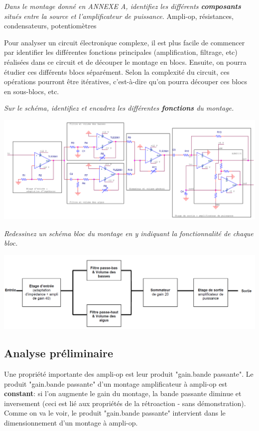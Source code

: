 {
\textit{Dans le montage donné en ANNEXE A, identifiez les différents \textbf{composants} situés entre la source et l'amplificateur de puissance.}
}
{%
Ampli-op, résistances, condensateurs, potentiomètres
}

Pour analyser un circuit électronique complexe, il est plus facile de commencer par identifier les différentes fonctions principales (amplification, filtrage, etc) réalisées dans ce circuit et de découper le montage en blocs. Ensuite, on pourra étudier ces différents blocs séparément. Selon la complexité du circuit, ces opérations pourront être itératives, c'est-à-dire qu'on pourra découper ces blocs en sous-blocs, etc.

{
\textit{Sur le schéma, identifiez et encadrez les différentes \textbf{fonctions} du montage.}
}
{%
\begin{center}
\includegraphics[width=\textwidth]{decoupageenblocs.PNG}
\label{decoupageenblocs}
\end{center}
}

{
\textit{Redessinez un schéma bloc du montage en y indiquant la fonctionnalité de chaque bloc.}
}
{%
\begin{center}
\includegraphics[scale=0.35]{fonctionsblocs.PNG}
\label{fonctionsblocs}
\end{center}
}

\subsection{Analyse préliminaire}
\label{analysepréliminaire}
Une propriété importante des ampli-op est leur produit "gain.bande passante". Le produit "gain.bande passante" d'un montage amplificateur à ampli-op est \textbf{constant}: si l'on augmente le gain du montage, la bande passante diminue et inversement (ceci est lié aux propriétés de la rétroaction - sans démonstration). Comme on va le voir, le produit "gain.bande passante" intervient dans le dimensionnement d'un montage à ampli-op.\\

